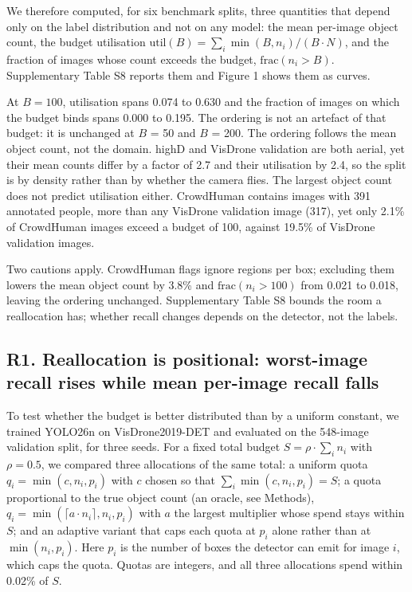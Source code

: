 \documentclass[sn-mathphys,Numbered]{sn-jnl}
\begin{document}
We therefore computed, for six benchmark splits, three quantities that depend only on the label distribution and not on any model: the mean per-image object count, the budget utilisation $\mathrm{util}(B) = \sum_i \min(B, n_i) / (B\cdot{}N)$, and the fraction of images whose count exceeds the budget, $\mathrm{frac}(n_i > B)$. Supplementary Table S8 reports them and Figure 1 shows them as curves.

At $B = 100$, utilisation spans 0.074 to 0.630 and the fraction of images on which the budget binds spans 0.000 to 0.195. The ordering is not an artefact of that budget: it is unchanged at $B$ = 50 and $B$ = 200. The ordering follows the mean object count, not the domain. highD and VisDrone validation are both aerial, yet their mean counts differ by a factor of 2.7 and their utilisation by 2.4, so the split is by density rather than by whether the camera flies. The largest object count does not predict utilisation either. CrowdHuman contains images with 391 annotated people, more than any VisDrone validation image (317), yet only 2.1\% of CrowdHuman images exceed a budget of 100, against 19.5\% of VisDrone validation images.

Two cautions apply. CrowdHuman flags ignore regions per box; excluding them lowers the mean object count by 3.8\% and $\mathrm{frac}(n_i > 100)$ from 0.021 to 0.018, leaving the ordering unchanged. Supplementary Table S8 bounds the room a reallocation has; whether recall changes depends on the detector, not the labels.

\subsection{R1. Reallocation is positional: worst-image recall rises while mean per-image recall falls}

To test whether the budget is better distributed than by a uniform constant, we trained YOLO26n on VisDrone2019-DET and evaluated on the 548-image validation split, for three seeds. For a fixed total budget $S = \rho\cdot{}\sum_i n_i$ with $\rho = 0.5$, we compared three allocations of the same total: a uniform quota $q_i = \min(c, n_i, p_i)$ with $c$ chosen so that $\sum_i \min(c, n_i, p_i) = S$; a quota proportional to the true object count (an oracle, see Methods), $q_i = \min(\lceil{}a\cdot{}n_i\rceil{}, n_i, p_i)$ with $a$ the largest multiplier whose spend stays within $S$; and an adaptive variant that caps each quota at $p_i$ alone rather than at $\min(n_i, p_i)$. Here $p_i$ is the number of boxes the detector can emit for image $i$, which caps the quota. Quotas are integers, and all three allocations spend within 0.02\% of $S$.
\end{document}
